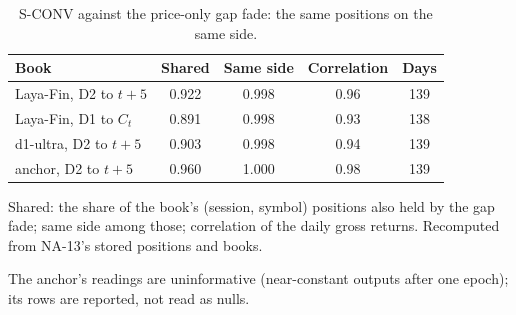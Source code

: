 \begin{table}[htbp]
\centering
\small
\begin{threeparttable}
\caption{S-CONV against the price-only gap fade: the same positions on the same side.}\label{tab:a-sconv-overlap}
\begin{tabular}{@{}lS[table-format=1.3]S[table-format=1.3]S[table-format=1.2]S[table-format=3.0]@{}}
\toprule
Book & {Shared} & {Same side} & {Correlation} & {Days} \\
\midrule
Laya-Fin, D2 to $t{+}5$ & 0.922 & 0.998 & 0.96 & 139 \\
Laya-Fin, D1 to $C_t$ & 0.891 & 0.998 & 0.93 & 138 \\
d1-ultra, D2 to $t{+}5$ & 0.903 & 0.998 & 0.94 & 139 \\
anchor, D2 to $t{+}5$ & 0.960 & 1.000 & 0.98 & 139 \\
\bottomrule
\end{tabular}
\begin{tablenotes}[flushleft]\footnotesize
\item Shared: the share of the book's (session, symbol) positions also held by the gap fade; same side among those; correlation of the daily gross returns. Recomputed from NA-13's stored positions and books.
\item The anchor's readings are uninformative (near-constant outputs after one epoch); its rows are reported, not read as nulls.
\end{tablenotes}
\end{threeparttable}
\end{table}
